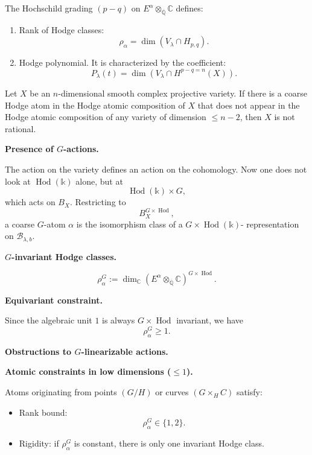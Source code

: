 The Hochschild grading $(p-q)$ on
$E^\alpha\otimes_{\overline{\mathbb{Q}}}
\mathbb{C}$ defines:
\begin{enumerate}
\item Rank of Hodge classes:
$$
\rho_\alpha
=
\dim
\left(V_\lambda\cap H_{p,q}\right).
$$
\item Hodge polynomial.
It is characterized by the
coefficient:
$$
P_\lambda(t)=
\dim\left(
V_\lambda\cap H^{p-q=n}(X)
\right).
$$
\end{enumerate}

\begin{theorem}
Let $X$ be an $n$-dimensional
smooth complex projective variety.
If there is a coarse Hodge atom in
the Hodge atomic composition of $X$
that does not appear in the Hodge
atomic composition of any variety
of dimension $\leq n-2$, then $X$
is not rational.
\end{theorem}

\medskip\noindent
{\bf Presence of $G$-actions.}

The action on the variety defines
an action on the cohomology.
Now one does not look at
$\operatorname{Hod}(\mathbb{k})$
alone, but at
$$
\operatorname{Hod}(\mathbb{k})
\times G,
$$
which acts on $B_X$.
Restricting to
$$
B_X^{G\times\operatorname{Hod}},
$$
a coarse $G$-atom $\alpha$ is the
isomorphism class of a
$G\times\operatorname{Hod}(\mathbb{k})$-
representation on
$\mathcal{B}_{\lambda,b}$.

\medskip\noindent
{\bf $G$-invariant Hodge classes.}

$$
\rho_\alpha^G:=
\dim_{\mathbb{C}}
\left(
E^\alpha\otimes_{\overline{\mathbb{Q}}}
\mathbb{C}
\right)^{
G\times\operatorname{Hod}
}.
$$

\medskip\noindent
{\bf Equivariant constraint.}

Since the algebraic unit $1$ is
always $G\times\operatorname{Hod}$
invariant, we have
$$
\rho_\alpha^G\geq 1.
$$

\medskip\noindent
{\bf Obstructions to
$G$-linearizable actions.}

\medskip\noindent
{\bf Atomic constraints in low
dimensions ($\leq 1$).}

Atoms originating from points
$(G/H)$ or curves
$(G\times_H C)$ satisfy:
\begin{itemize}
\item Rank bound:
$$
\rho_\alpha^G\in\{1,2\}.
$$
\item Rigidity:
if $\rho_\alpha^G$ is constant,
there is only one invariant Hodge
class.
\end{itemize}

